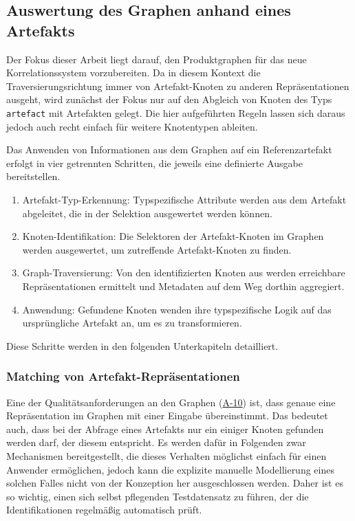 \subsection{Auswertung des Graphen anhand eines Artefakts}\label{subsec:model-apply-to-artifact}

Der Fokus dieser Arbeit liegt darauf, den Produktgraphen für das neue Korrelationssystem vorzubereiten.
Da in diesem Kontext die Traversierungsrichtung immer von Artefakt-Knoten zu anderen Repräsentationen ausgeht, wird zunächst der Fokus nur auf den Abgleich von Knoten des Typs \texttt{artefact} mit Artefakten gelegt.
Die hier aufgeführten Regeln lassen sich daraus jedoch auch recht einfach für weitere Knotentypen ableiten.

Das Anwenden von Informationen aus dem Graphen auf ein Referenzartefakt erfolgt in vier getrennten Schritten, die jeweils eine definierte Ausgabe bereitstellen.

\begin{enumerate}
    \itemsep0em
    \item Artefakt-Typ-Erkennung: Typspezifische Attribute werden aus dem Artefakt abgeleitet, die in der Selektion ausgewertet werden können.
    \item Knoten-Identifikation: Die Selektoren der Artefakt-Knoten im Graphen werden ausgewertet, um zutreffende Artefakt-Knoten zu finden.
    \item Graph-Traversierung: Von den identifizierten Knoten aus werden erreichbare Repräsentationen ermittelt und Metadaten auf dem Weg dorthin aggregiert.
    \item Anwendung: Gefundene Knoten wenden ihre typspezifische Logik auf das ursprüngliche Artefakt an, um es zu transformieren.
\end{enumerate}

Diese Schritte werden in den folgenden Unterkapiteln detailliert.

\subsubsection{Matching von Artefakt-Repräsentationen}\label{subsubsec:model-matching}

Eine der Qualitätsanforderungen an den Graphen (\hyperref[subsec:req-graph-inner-consistency]{A-10}) ist, dass genaue eine Repräsentation im Graphen mit einer Eingabe übereinstimmt.
Das bedeutet auch, dass bei der Abfrage eines Artefakts nur ein einiger Knoten gefunden werden darf, der diesem entspricht.
Es werden dafür in Folgenden zwar Mechanismen bereitgestellt, die dieses Verhalten möglichst einfach für einen Anwender ermöglichen, jedoch kann die explizite manuelle Modellierung eines solchen Falles nicht von der Konzeption her ausgeschlossen werden.
Daher ist es so wichtig, einen sich selbst pflegenden Testdatensatz zu führen, der die Identifikationen regelmäßig automatisch prüft.

